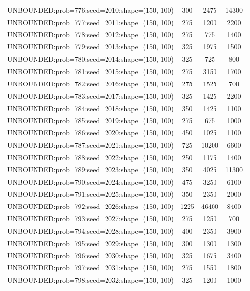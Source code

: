 \begin{longtable}{lccc}
UNBOUNDED:prob=776:seed=2010:shape=(150, 100) &      300 &  2475 &  14300 \\
UNBOUNDED:prob=777:seed=2011:shape=(150, 100) &      275 &  1200 &   2200 \\
UNBOUNDED:prob=778:seed=2012:shape=(150, 100) &      275 &   775 &   1400 \\
UNBOUNDED:prob=779:seed=2013:shape=(150, 100) &      325 &  1975 &   1500 \\
UNBOUNDED:prob=780:seed=2014:shape=(150, 100) &      325 &   725 &    800 \\
UNBOUNDED:prob=781:seed=2015:shape=(150, 100) &      275 &  3150 &   1700 \\
UNBOUNDED:prob=782:seed=2016:shape=(150, 100) &      275 &  1525 &    700 \\
UNBOUNDED:prob=783:seed=2017:shape=(150, 100) &      325 &  1425 &   2200 \\
UNBOUNDED:prob=784:seed=2018:shape=(150, 100) &      350 &  1425 &   1100 \\
UNBOUNDED:prob=785:seed=2019:shape=(150, 100) &      275 &   675 &   1000 \\
UNBOUNDED:prob=786:seed=2020:shape=(150, 100) &      450 &  1025 &   1100 \\
UNBOUNDED:prob=787:seed=2021:shape=(150, 100) &      725 & 10200 &   6600 \\
UNBOUNDED:prob=788:seed=2022:shape=(150, 100) &      250 &  1175 &   1400 \\
UNBOUNDED:prob=789:seed=2023:shape=(150, 100) &      350 &  4025 &  11300 \\
UNBOUNDED:prob=790:seed=2024:shape=(150, 100) &      475 &  3250 &   6100 \\
UNBOUNDED:prob=791:seed=2025:shape=(150, 100) &      350 &  2350 &   2000 \\
UNBOUNDED:prob=792:seed=2026:shape=(150, 100) &     1225 & 46400 &   8400 \\
UNBOUNDED:prob=793:seed=2027:shape=(150, 100) &      275 &  1250 &    700 \\
UNBOUNDED:prob=794:seed=2028:shape=(150, 100) &      400 &  2350 &   3900 \\
UNBOUNDED:prob=795:seed=2029:shape=(150, 100) &      300 &  1300 &   1300 \\
UNBOUNDED:prob=796:seed=2030:shape=(150, 100) &      325 &  1675 &   3400 \\
UNBOUNDED:prob=797:seed=2031:shape=(150, 100) &      275 &  1550 &   1800 \\
UNBOUNDED:prob=798:seed=2032:shape=(150, 100) &      325 &  1200 &   1000 \\

\end{longtable}

